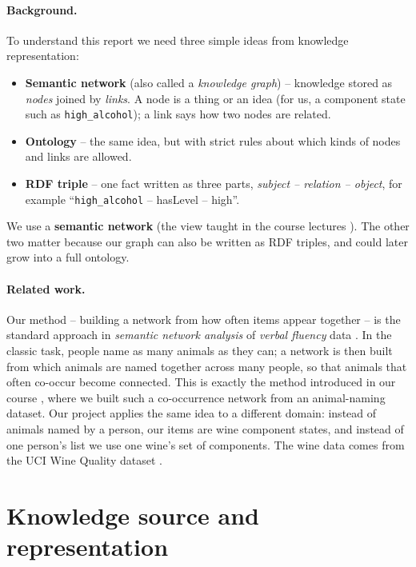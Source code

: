 \documentclass[12pt,a4paper]{article}
\begin{document}
	\paragraph{Background.}
	To understand this report we need three simple ideas from knowledge
	representation:
	\begin{itemize}
		\item \textbf{Semantic network} (also called a \emph{knowledge graph}) --
		knowledge stored as \emph{nodes} joined by \emph{links}. A node is a thing or
		an idea (for us, a component state such as \texttt{high\_alcohol}); a link says
		how two nodes are related.
		\item \textbf{Ontology} -- the same idea, but with strict rules about which
		kinds of nodes and links are allowed.
		\item \textbf{RDF triple} -- one fact written as three parts,
		\emph{subject -- relation -- object}, for example
		``\texttt{high\_alcohol} -- hasLevel -- high''.
	\end{itemize}
	We use a \textbf{semantic network} (the view taught in the course lectures
	\citep{khalid2026semnet}). The other two matter because our graph can also be
	written as RDF triples, and could later grow into a full ontology.

	\paragraph{Related work.}
	Our method -- building a network from how often items appear together -- is the
	standard approach in \emph{semantic network analysis} of \emph{verbal fluency}
	data \citep{christensen2023semna}. In the classic task, people name as many
	animals as they can; a network is then built from which animals are named
	together across many people, so that animals that often co-occur become
	connected. This is exactly the method introduced in our course
	\citep{khalid2026semnet}, where we built such a co-occurrence network from an
	animal-naming dataset. Our project applies the same idea to a different domain:
	instead of animals named by a person, our items are wine component states, and
	instead of one person's list we use one wine's set of components. The wine data
	comes from the UCI Wine Quality dataset \citep{wine_quality_186}.

	\section*{Knowledge source and representation}
\end{document}

